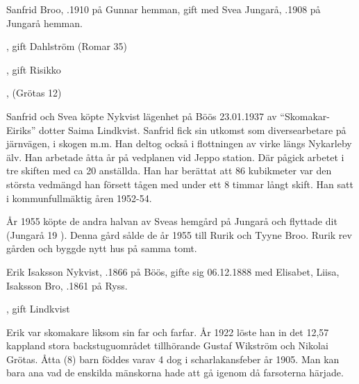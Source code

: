 %
Sanfrid Broo, .1910 på Gunnar hemman, gift med Svea Jungarå, .1908 på Jungarå hemman.
\begin{jhchildren}
  \item {}, gift Dahlström (Romar 35)
  \item {}, gift Risikko
  \item {}, (Grötas 12)
\end{jhchildren}
Sanfrid och Svea köpte Nykvist lägenhet på Böös 23.01.1937 av ``Skomakar-Eiriks'' dotter Saima Lindkvist. Sanfrid fick sin utkomst som diversearbetare på järnvägen, i skogen m.m.	Han deltog också i flottningen av virke längs Nykarleby älv. Han arbetade åtta år på vedplanen vid Jeppo station. Där pågick arbetet i tre skiften med ca 20 anställda. Han har berättat att 86 kubikmeter var den största vedmängd han försett tågen med under ett 8 timmar långt skift. Han satt i kommunfullmäktig åren 1952-54.

År 1955 köpte de andra halvan av Sveas hemgård på Jungarå och flyttade dit (Jungarå  19 ). Denna  gård sålde de år 1955 till Rurik och Tyyne Broo. Rurik rev gården och byggde nytt hus på samma tomt.


%
Erik Isaksson Nykvist, .1866 på Böös, gifte sig 06.12.1888 med Elisabet, Liisa, Isaksson Bro, .1861 på Ryss.
\begin{jhchildren}
  \item {}
  \item {}
  \item {}
  \item {}
  \item {}
  \item {}
  \item {}
  \item {}, gift Lindkvist
\end{jhchildren}
Erik var skomakare liksom sin far och farfar. År 1922 löste han in det 12,57 kappland stora backstuguområdet tillhörande Gustaf Wikström 	och Nikolai Grötas. Åtta (8) barn föddes varav 4 dog i scharlakansfeber år 1905. Man kan bara ana vad de enskilda mänskorna hade att gå igenom då farsoterna härjade.

